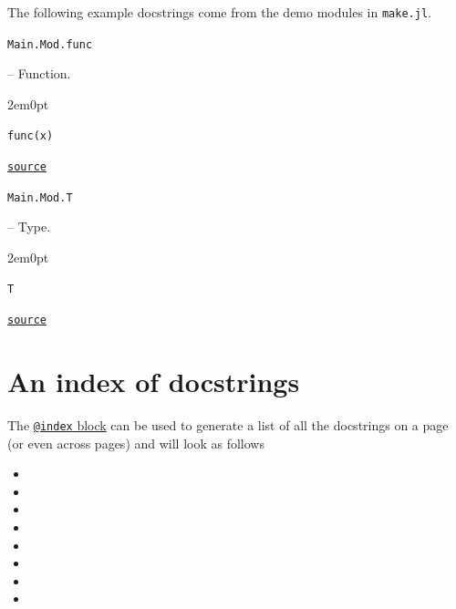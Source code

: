 \label{4859465668994674752}{}


The following example docstrings come from the demo modules in \texttt{make.jl}.


\hypertarget{5669384191785722396}{\texttt{Main.Mod.func}}  -- {Function.}

\begin{adjustwidth}{2em}{0pt}


\begin{verbatim}
func(x)
\end{verbatim}




\href{https://example.org/Repository.jl/blob/make.jl#L30-34}{\texttt{source}}


\end{adjustwidth}
\hypertarget{1885743281855441478}{\texttt{Main.Mod.T}}  -- {Type.}

\begin{adjustwidth}{2em}{0pt}


\begin{verbatim}
T
\end{verbatim}




\href{https://example.org/Repository.jl/blob/make.jl#L37-41}{\texttt{source}}


\end{adjustwidth}

\section{An index of docstrings}



\label{4901604269105032859}{}


The \href{@ref}{\texttt{@index} block} can be used to generate a list of all the docstrings on a page (or even across pages) and will look as follows


\begin{itemize}
\item {}
\item {}
\item {}
\item {}
\item {}
\item {}
\item {}
\item {}
\end{itemize}


